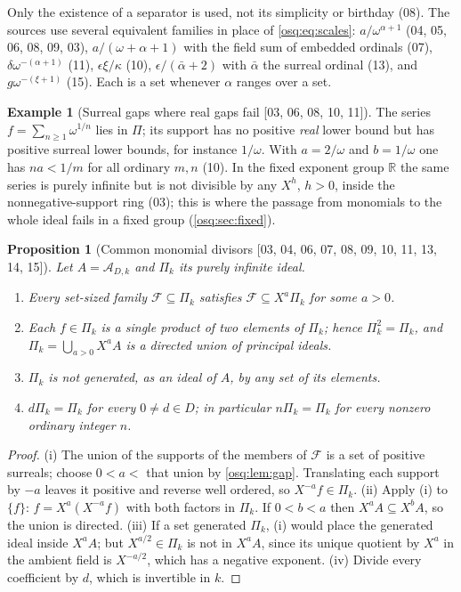 \documentclass[11pt,letterpaper]{article}
\numberwithin{equation}{section}
\newtheorem{proposition}[proposition]{Proposition}
\theoremstyle{definition}
\newtheorem{example}[example]{Example}
\theoremstyle{remark}
\theoremstyle{plain}
\newcommand{\R}{\mathbb R}
\newcommand{\A}{\mathcal A}          %
\newcommand{\src}[1]{\textup{\textsf{[#1]}}}
\begin{document}
Only the existence of a separator is used, not its simplicity or birthday (08). The
sources use several equivalent families in place of \eqref{osq:eq:scales}:
$a/\omega^{\alpha+1}$ (04, 05, 06, 08, 09, 03), $a/(\omega+\alpha+1)$ with the
field sum of embedded ordinals (07), $\delta\omega^{-(\alpha+1)}$ (11),
$\epsilon\xi/\kappa$ (10), $\epsilon/(\bar\alpha+2)$ with $\bar\alpha$ the surreal ordinal (13), and
$g\omega^{-(\xi+1)}$ (15). Each is a set whenever $\alpha$ ranges over a set.

\begin{example}[Surreal gaps where real gaps fail \src{03, 06, 08, 10, 11}]\label{osq:ex:gap}
The series $f=\sum_{n\ge1}\omega^{1/n}$ lies in $\Pi$; its support has no positive
\emph{real} lower bound but has positive surreal lower bounds, for instance $1/\omega$.
With $a=2/\omega$ and $b=1/\omega$ one has $na<1/m$ for all ordinary $m,n$ (10). In the
fixed exponent group $\R$ the same series is purely infinite but is not divisible by any
$X^h$, $h>0$, inside the nonnegative-support ring (03); this is where the passage from
monomials to the whole ideal fails in a fixed group (\cref{osq:sec:fixed}).
\end{example}

\begin{proposition}[Common monomial divisors \src{03, 04, 06, 07, 08, 09, 10, 11, 13, 14, 15}]\label{osq:prop:common}
Let $A=\A_{D,k}$ and $\Pi_k$ its purely infinite ideal.
\begin{enumerate}
\item Every set-sized family $\mathcal F\subseteq\Pi_k$ satisfies
$\mathcal F\subseteq X^a\Pi_k$ for some $a>0$.
\item Each $f\in\Pi_k$ is a single product of two elements of $\Pi_k$; hence
$\Pi_k^2=\Pi_k$, and $\Pi_k=\bigcup_{a>0}X^aA$ is a directed union of principal ideals.
\item $\Pi_k$ is not generated, as an ideal of $A$, by any set of its elements.
\item $d\Pi_k=\Pi_k$ for every $0\neq d\in D$; in particular $n\Pi_k=\Pi_k$ for every
nonzero ordinary integer $n$.
\end{enumerate}
\end{proposition}
\begin{proof}
(i) The union of the supports of the members of $\mathcal F$ is a set of positive surreals;
choose $0<a<$ that union by \cref{osq:lem:gap}. Translating each support by $-a$ leaves it
positive and reverse well ordered, so $X^{-a}f\in\Pi_k$.
(ii) Apply (i) to $\{f\}$: $f=X^a(X^{-a}f)$ with both factors in $\Pi_k$. If $0<b<a$ then
$X^aA\subseteq X^bA$, so the union is directed.
(iii) If a set generated $\Pi_k$, (i) would place the generated ideal inside $X^aA$; but
$X^{a/2}\in\Pi_k$ is not in $X^aA$, since its unique quotient by $X^a$ in the ambient field
is $X^{-a/2}$, which has a negative exponent.
(iv) Divide every coefficient by $d$, which is invertible in $k$.
\end{proof}
\end{document}
